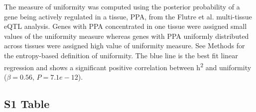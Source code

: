 \documentclass[10pt,letterpaper]{article}
\begin{document}
The measure of uniformity was computed using the posterior probability of a gene being actively regulated in a tissue, PPA, from the Flutre et al. \cite{Flutre_2013} multi-tissue eQTL analysis. Genes with PPA concentrated in one tissue were assigned small values of the uniformity measure whereas genes with PPA uniformly distributed across tissues were assigned high value of uniformity measure. See Methods for the entropy-based definition of uniformity. The blue line is the best fit linear regression and shows a significant positive correlation between h\textsuperscript{2} and uniformity ($\beta = 0.56$, $P = 7.1e-12$).
\pagebreak


\subsection*{S1 Table}
\label{S1_Table}
\end{document}
